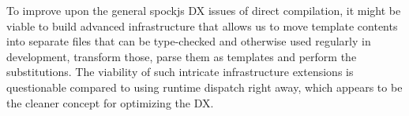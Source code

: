 To improve upon the general spockjs DX issues of direct compilation,
it might be viable to build advanced infrastructure
that allows us to move template contents into separate files
that can be type-checked and otherwise used regularly in development,
transform those, parse them as templates and perform the substitutions.
The viability of such intricate infrastructure extensions
is questionable compared to using runtime dispatch right away,
which appears to be the cleaner concept for optimizing the DX.
